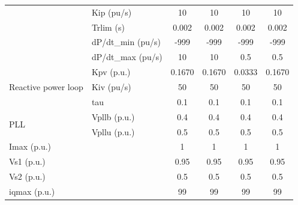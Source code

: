 \documentclass{report}
\begin{document}
\begin{table}[H]
\begin{tabular}{ll|c|c|c|c}
\multicolumn{1}{l|}{}                                     & Kip (pu/s)       & 10        & 10        & 10        & 10        \\ \cline{2-6} 
\multicolumn{1}{l|}{}                                     & Trlim (s)     & 0.002     & 0.002     & 0.002     & 0.002     \\ \cline{2-6} 
\multicolumn{1}{l|}{}                                     & dP/dt\_min (pu/s) & -999      & -999      & -999      & -999      \\ \cline{2-6} 
\multicolumn{1}{l|}{}                                     & dP/dt\_max (pu/s) & 10        & 10        & 0.5       & 0.5       \\ \hline
\multicolumn{1}{l|}{\multirow{3}{*}{Reactive power loop}} & Kpv (p.u.)       & 0.1670    & 0.1670    & 0.0333    & 0.1670    \\ \cline{2-6} 
\multicolumn{1}{l|}{}                                     & Kiv (pu/s)       & 50        & 50        & 50        & 50        \\ \cline{2-6} 
\multicolumn{1}{l|}{}                                     & tau        & 0.1       & 0.1       & 0.1       & 0.1       \\ \hline
\multicolumn{1}{l|}{\multirow{2}{*}{PLL}}                 & Vpllb (p.u.)     & 0.4       & 0.4       & 0.4       & 0.4       \\ \cline{2-6} 
\multicolumn{1}{l|}{}                                     & Vpllu (p.u.)     & 0.5       & 0.5       & 0.5       & 0.5       \\ \hline
\multicolumn{2}{l|}{Imax (p.u.)}                                              & 1         & 1         & 1         & 1         \\ \hline
\multicolumn{2}{l|}{Vs1 (p.u.)}                                               & 0.95      & 0.95      & 0.95      & 0.95      \\ \hline
\multicolumn{2}{l|}{Vs2 (p.u.)}                                               & 0.5       & 0.5       & 0.5       & 0.5       \\ \hline
\multicolumn{2}{l|}{iqmax (p.u.)}                                             & 99        & 99        & 99        & 99       
\end{tabular}
\label{table_4VSC_model_parameters_OP1}
\end{table}
\end{document}
